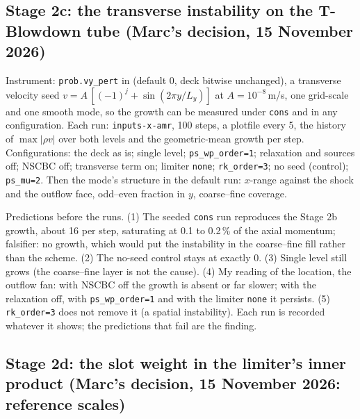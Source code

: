 \documentclass[11pt,a4paper]{article}
\newcommand{\code}[1]{\texttt{\small #1}}
\begin{document}
\subsection*{Stage 2c: the transverse instability on the T-Blowdown tube (Marc's decision, 15 November 2026)}

Instrument: \code{prob.vy\_pert} in 
(default 0, deck bitwise unchanged), a transverse velocity seed
$v = A\,[(-1)^j + \sin(2\pi y/L_y)]$ at $A = 10^{-8}$\,m/s, one grid-scale
and one smooth mode, so the growth can be measured under \code{cons} and
in any configuration.  Each run: \code{inputs-x-amr}, 100 steps, a
plotfile every 5, the history of $\max|\rho v|$ over both levels and the
geometric-mean growth per step.  Configurations: the deck as is; single
level; \code{ps\_wp\_order=1}; relaxation and sources off; NSCBC off;
transverse term on; limiter \code{none}; \code{rk\_order=3}; no seed
(control); \code{ps\_mu=2}.  Then the mode's structure in the default
run: $x$-range against the shock and the outflow face, odd--even fraction
in $y$, coarse--fine coverage.

Predictions before the runs.  (1) The seeded \code{cons} run reproduces
the Stage 2b growth, about 16 per step, saturating at 0.1 to 0.2\,\% of
the axial momentum; falsifier: no growth, which would put the instability
in the coarse--fine fill rather than the scheme.  (2) The no-seed control
stays at exactly 0.  (3) Single level still grows (the coarse--fine layer
is not the cause).  (4) My reading of the location, the outflow fan:
with NSCBC off the growth is absent or far slower; with the relaxation
off, with \code{ps\_wp\_order=1} and with the limiter \code{none} it
persists.  (5) \code{rk\_order=3} does not remove it (a spatial
instability).  Each run is recorded whatever it shows; the predictions
that fail are the finding.

\subsection*{Stage 2d: the slot weight in the limiter's inner product (Marc's decision, 15 November 2026: reference scales)}
\end{document}
